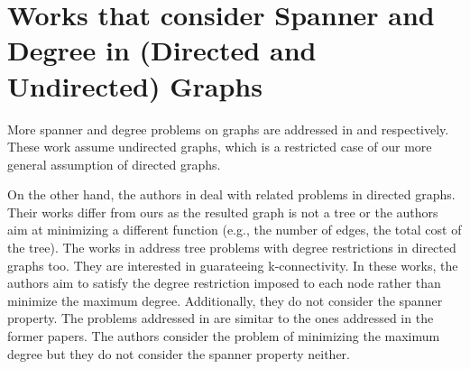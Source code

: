 \section{Works that consider Spanner and Degree in (Directed and Undirected) Graphs}
\label{sec:properties_in_graphs}
More spanner and degree problems on graphs are addressed in \cite{Fomin2011,Dinitz2011,Berman2011,Elkin2011b,Hajiaghayi2009,Naor1997} and 
\cite{Khandekar2011,Goemans2006,Singh2007,Elkin2006,Bansal2009,Nutov2011,Feder2006,Ravi1992} respectively. These work assume undirected graphs, which is a restricted case of our 
more general assumption of directed graphs. 

On the other hand, the authors in \cite{Dinitz2011,Naor1997,Berman2011} deal with related problems in directed graphs. Their 
works differ from ours as the resulted graph is not a tree or the authors aim at minimizing a different function (e.g., the number of edges, the total cost of the tree). The works 
in \cite{Bansal2009,Nutov2011} address tree problems with degree restrictions in directed graphs too. They are interested in guarateeing k-connectivity. 
In these works, the authors aim to satisfy the degree restriction imposed to each node rather than minimize the maximum degree. 
Additionally, they do not consider the spanner property. The problems addressed in \cite{Feder2006} are simitar to the ones addressed in the former papers. The authors 
consider the problem of minimizing the maximum degree but they do not consider the spanner property neither.


